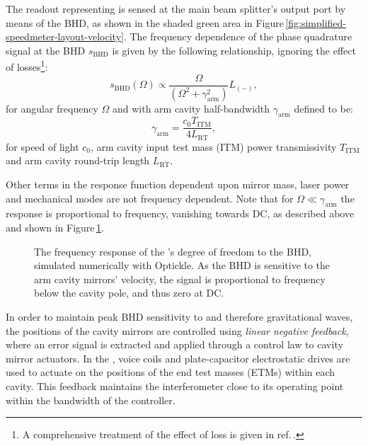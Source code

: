 The readout representing \LMINUS{} is sensed at the main beam splitter's output port by means of the \gls{BHD}, as shown in the shaded green area in Figure\,\ref{fig:simplified-speedmeter-layout-velocity}. The frequency dependence of the phase quadrature signal at the \gls{BHD} $s_{\textrm{BHD}}$ is given by the following relationship, ignoring the effect of losses\footnote{A comprehensive treatment of the effect of loss is given in ref.\,\cite{Danilishin2015}.}:
\begin{equation}
  \label{eq:asymdarmbhdresponse}
  s_{\textrm{BHD}} \left( \Omega \right) \propto \frac{\Omega}{ \left(\Omega^2 + \gamma_{\textrm{arm}}^2 \right)} L_{\left(-\right)},
\end{equation}
for angular frequency $\Omega$ and with arm cavity half-bandwidth $\gamma_{\textrm{arm}}$ defined to be:
\begin{equation}
  \gamma_{\textrm{arm}} = \frac{c_{0} T_{\textrm{ITM}}}{4 L_{\textrm{RT}}},
\end{equation}
for speed of light $c_{0}$, arm cavity input test mass (\gls{ITM}) power transmissivity $T_{\textrm{ITM}}$ and arm cavity round-trip length $L_{\textrm{RT}}$.
   
Other terms in the response function dependent upon mirror mass, laser power and mechanical modes are not frequency dependent. Note that for $\Omega \ll \gamma_{\textrm{arm}}$ the response is proportional to frequency, vanishing towards \gls{DC}, as described above and shown in Figure\,\ref{fig:bhd-response}.

\begin{figure}
  \centering
  
  \caption[The frequency response of the \SSMEXPT{}'s differential arm cavity degree of freedom to the balanced homodyne readout]{\label{fig:bhd-response}The frequency response of the \SSMEXPT{}'s \LMINUS{} degree of freedom to the \gls{BHD}, simulated numerically with Optickle. As the \gls{BHD} is sensitive to the arm cavity mirrors' velocity, the signal is proportional to frequency below the cavity pole, and thus zero at \gls{DC}.}
\end{figure}

In order to maintain peak \gls{BHD} sensitivity to \LMINUS{} and therefore gravitational waves, the positions of the cavity mirrors are controlled using \emph{linear negative feedback}, where an error signal is extracted and applied through a control law to cavity mirror actuators. In the \SSMEXPT{}, voice coils and plate-capacitor electrostatic drives are used to actuate on the positions of the end test masses (\glspl{ETM}) within each cavity. This feedback maintains the interferometer close to its operating point within the bandwidth of the controller.
   
